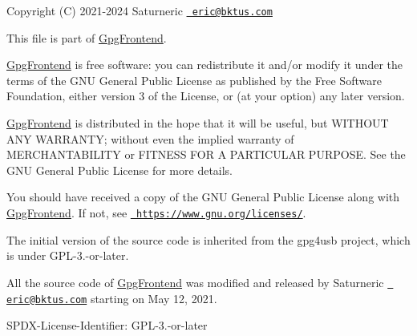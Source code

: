 Copyright (C) 2021-\/2024 Saturneric \href{mailto:eric@bktus.com}{\texttt{ eric@bktus.\+com}}

This file is part of \mbox{\hyperlink{namespaceGpgFrontend}{Gpg\+Frontend}}.

\mbox{\hyperlink{namespaceGpgFrontend}{Gpg\+Frontend}} is free software\+: you can redistribute it and/or modify it under the terms of the GNU General Public License as published by the Free Software Foundation, either version 3 of the License, or (at your option) any later version.

\mbox{\hyperlink{namespaceGpgFrontend}{Gpg\+Frontend}} is distributed in the hope that it will be useful, but WITHOUT ANY WARRANTY; without even the implied warranty of MERCHANTABILITY or FITNESS FOR A PARTICULAR PURPOSE. See the GNU General Public License for more details.

You should have received a copy of the GNU General Public License along with \mbox{\hyperlink{namespaceGpgFrontend}{Gpg\+Frontend}}. If not, see \href{https://www.gnu.org/licenses/}{\texttt{ https\+://www.\+gnu.\+org/licenses/}}.

The initial version of the source code is inherited from the gpg4usb project, which is under GPL-\/3.-\/or-\/later.

All the source code of \mbox{\hyperlink{namespaceGpgFrontend}{Gpg\+Frontend}} was modified and released by Saturneric \href{mailto:eric@bktus.com}{\texttt{ eric@bktus.\+com}} starting on May 12, 2021.

SPDX-\/\+License-\/\+Identifier\+: GPL-\/3.-\/or-\/later 